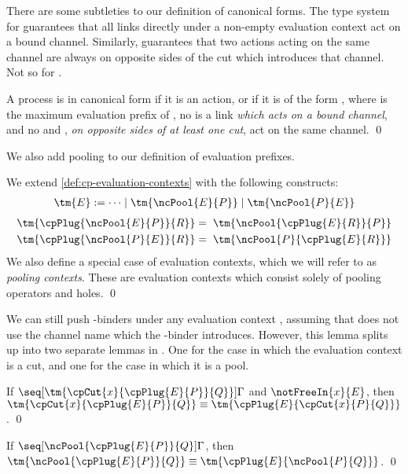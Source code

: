 \documentclass[UKenglish]{llncs}
\begin{document}
There are some subtleties to our definition of canonical forms. The type system
for \cp guarantees that all links directly under a non-empty evaluation context
act on a bound channel. Similarly, \cp guarantees that two actions acting on the
same channel are always on opposite sides of the cut which introduces that
channel. Not so for \nodcap.
\begin{definition}\label{def:nc-canonical-forms}
  A process  is in canonical form if it is an action, or if it is of the
  form , where  is the maximum evaluation
  prefix of , no  is a link \emph{which acts on a bound channel},
  and no  and , \emph{on opposite sides of at least one cut},
  act on the same channel.
  \qed
\end{definition}
We also add pooling to our definition of evaluation prefixes.
\begin{definition}\label{def:nc-evaluation-contexts}
  We extend \cref{def:cp-evaluation-contexts} with the following constructs:
  \begin{align*}
    \tm{E} := \dots \mid \tm{\ncPool{E}{P}} \mid \tm{\ncPool{P}{E}}
  \end{align*}
  \begin{align*}
    \tm{\cpPlug{\ncPool{E}{P}}{R}}
    & = \; \tm{\ncPool{\cpPlug{E}{R}}{P}}
    \\
    \tm{\cpPlug{\ncPool{P}{E}}{R}}
    & = \; \tm{\ncPool{P}{\cpPlug{E}{R}}}
  \end{align*}
  We also define a special case of evaluation contexts, which we will refer to
  as \emph{pooling contexts}. These are evaluation contexts which consist solely
  of pooling operators and holes.
  \qed
\end{definition}
We can still push \textnu-binders under any evaluation context , assuming
that  does not use the channel name which the \textnu-binder introduces.
However, this lemma splits up into two separate lemmas in \nodcap.
One for the case in which the evaluation context is a cut, and one for the case
in which it is a pool.
\begin{lemma}\label{thm:nc-display-cut}
  If $\seq[{ \tm{\cpCut{x}{\cpPlug{E}{P}}{Q}} }]{ \Gamma }$ and
  $\notFreeIn{x}{E}$, then $\tm{\cpCut{x}{\cpPlug{E}{P}}{Q}} \equiv
  \tm{\cpPlug{E}{\cpCut{x}{P}{Q}}}$.
  \qed
\end{lemma}
\begin{lemma}\label{thm:nc-display-pool}
  If $\seq[{ \ncPool{\cpPlug{E}{P}}{Q} }]{ \Gamma }$, then
  $\tm{\ncPool{\cpPlug{E}{P}}{Q}} \equiv \tm{\cpPlug{E}{\ncPool{P}{Q}}}$. 
  \qed
\end{lemma}
\end{document}
